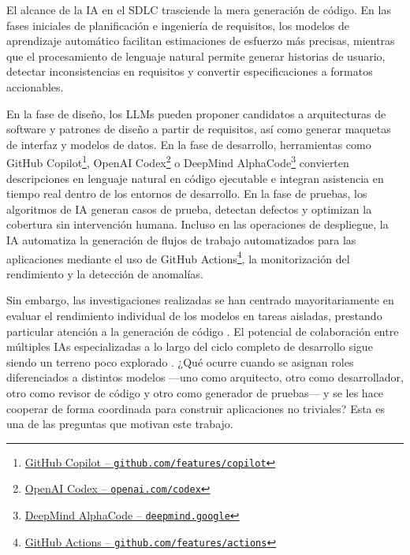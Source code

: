 
El alcance de la \ac{IA} en el \ac{SDLC} trasciende la mera generación de código. En las fases iniciales de planificación e ingeniería de requisitos, los modelos de aprendizaje automático facilitan estimaciones de esfuerzo más precisas, mientras que el procesamiento de lenguaje natural permite generar historias de usuario, detectar inconsistencias en requisitos y convertir especificaciones a formatos accionables.

En la fase de diseño, los \ac{LLMs} pueden proponer candidatos a arquitecturas de software y patrones de diseño a partir de requisitos, así como generar maquetas de interfaz y modelos de datos. En la fase de desarrollo, herramientas como GitHub Copilot\footnote{\href{https://github.com/features/copilot}{GitHub Copilot -- \texttt{github.com/features/copilot}}}, OpenAI Codex\footnote{\href{https://openai.com/codex}{OpenAI Codex -- \texttt{openai.com/codex}}} o DeepMind AlphaCode\footnote{\href{https://deepmind.google}{DeepMind AlphaCode -- \texttt{deepmind.google}}} convierten descripciones en lenguaje natural en código ejecutable e integran asistencia en tiempo real dentro de los entornos de desarrollo. En la fase de pruebas, los algoritmos de \ac{IA} generan casos de prueba, detectan defectos y optimizan la cobertura sin intervención humana. Incluso en las operaciones de despliegue, la \ac{IA} automatiza la generación de flujos de trabajo automatizados para las aplicaciones mediante el uso de GitHub Actions\footnote{\href{https://github.com/features/actions}{GitHub Actions -- \texttt{github.com/features/actions}}}, la monitorización del rendimiento y la detección de anomalías.

Sin embargo, las investigaciones realizadas se han centrado mayoritariamente en evaluar el rendimiento individual de los modelos en tareas aisladas, prestando particular atención a la generación de código \cite{Wang:2023:LLMReview, Tosi:2024:CodeQuality}. El potencial de colaboración entre múltiples \ac{IAs} especializadas a lo largo del ciclo completo de desarrollo sigue siendo un terreno poco explorado \cite{Turunen:2023:FromIdeas}. ¿Qué ocurre cuando se asignan roles diferenciados a distintos modelos ---uno como arquitecto, otro como desarrollador, otro como revisor de código y otro como generador de pruebas--- y se les hace cooperar de forma coordinada para construir aplicaciones no triviales? Esta es una de las preguntas que motivan este trabajo.

